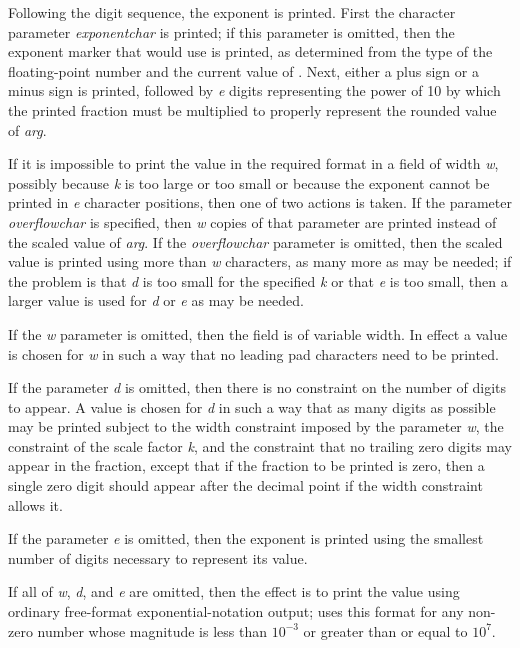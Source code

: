 \begin{flushdesc}
Following the digit sequence, the exponent is printed.
First the character parameter \emph{exponentchar} is printed; if this
parameter is omitted, then the exponent marker that
 would use is printed, as determined from the
type of the floating-point number and the current value of
.
Next, either a plus sign or a minus sign
is printed, followed by \emph{e} digits representing the power of
10 by which the printed fraction must be multiplied
to properly represent the rounded value of \emph{arg}.

If it is impossible to print the value in the required format in a field
of width \emph{w}, possibly because \emph{k} is too large or too small
or because the exponent cannot be printed in \emph{e} character positions,
then one of two actions is taken.  If the
parameter \emph{overflowchar} is specified, then \emph{w} copies of that
parameter are printed instead of the scaled value of \emph{arg}.
If the \emph{overflowchar} parameter is omitted, then the scaled value
is printed using more than \emph{w} characters, as many more as may be
needed; if the problem is that \emph{d} is too small for the specified \emph{k}
or that \emph{e} is too small, then a larger value is used for \emph{d} or \emph{e}
as may be needed.

If the \emph{w} parameter is omitted, then the field is of variable width.
In effect a value is chosen
for \emph{w} in such a way that no leading pad characters need to be printed.

If the parameter \emph{d} is omitted, then there is no constraint
on the number of digits to appear.
A value is chosen for \emph{d} in such a way that as many digits
as possible may be printed subject to the width constraint
imposed by the parameter \emph{w}, the constraint of the scale factor \emph{k},
and the constraint that no trailing
zero digits may appear in the fraction, except that if the
fraction to be printed is zero, then a single zero digit should
appear after the decimal point if the width constraint allows it.

If the parameter \emph{e} is omitted, then the exponent is printed
using the smallest number of digits necessary to represent its value.

If all of \emph{w}, \emph{d}, and \emph{e} are omitted, then the effect is to print
the value using ordinary free-format exponential-notation output;
 uses this format for any non-zero number whose magnitude
is less than $10^{-3}$ or greater than or equal to $10^7$.


\end{flushdesc}
